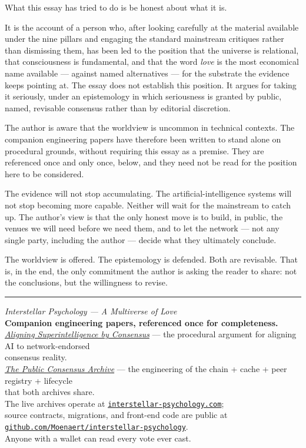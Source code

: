 \documentclass[11pt,a4paper]{article}
\begin{document}
What this essay has tried to do is be honest about what it is.

It is the account of a person who, after looking carefully at the
material available under the nine pillars and engaging the
standard mainstream critiques rather than dismissing them, has
been led to the position that the universe is relational, that
consciousness is fundamental, and that the word \emph{love} is
the most economical name available --- against named
alternatives --- for the substrate the evidence keeps pointing
at. The essay does not establish this position. It argues for
taking it seriously, under an epistemology in which seriousness
is granted by public, named, revisable consensus rather than by
editorial discretion.

The author is aware that the worldview is uncommon in technical
contexts. The companion engineering papers have therefore been
written to stand alone on procedural grounds, without requiring
this essay as a premise. They are referenced once and only once,
below, and they need not be read for the position here to be
considered.

The evidence will not stop accumulating. The artificial-intelligence
systems will not stop becoming more capable. Neither will wait for
the mainstream to catch up. The author's view is that the only
honest move is to build, in public, the venues we will need
before we need them, and to let the network --- not any single
party, including the author --- decide what they ultimately
conclude.

The worldview is offered. The epistemology is defended. Both are
revisable. That is, in the end, the only commitment the author
is asking the reader to share: not the conclusions, but the
willingness to revise.

\vspace{2em}
\hrule
\vspace{1em}

\begin{center}
\textit{Interstellar Psychology --- A Multiverse of Love}\\
\small
\textbf{Companion engineering papers, referenced once for completeness.}\\[0.4em]
\href{https://interstellar-psychology.com/artefacts/blockchain/superalignment.pdf}{\textit{Aligning Superintelligence by Consensus}} ---
the procedural argument for aligning AI to network-endorsed\\consensus reality.\\[0.4em]
\href{https://interstellar-psychology.com/artefacts/blockchain/archive.pdf}{\textit{The Public Consensus Archive}} ---
the engineering of the chain + cache + peer registry + lifecycle\\that both archives share.\\[0.6em]
The live archives operate at
\href{https://interstellar-psychology.com/}{\texttt{interstellar-psychology.com}};\\
source contracts, migrations, and front-end code are public at
\href{https://github.com/Moenaert/interstellar-psychology}{\texttt{github.com/Moenaert/interstellar-psychology}}.\\
Anyone with a wallet can read every vote ever cast.
\end{center}
\end{document}
